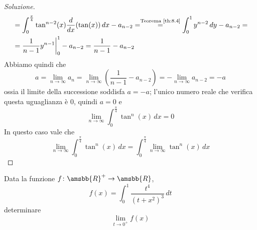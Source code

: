 \begin{proof}[Soluzione]
\[\begin{split}
        & = \int_0^{\frac{\pi}{4}}\tan^{n-2}(x) \frac{d}{dx}(\tan(x))\, dx - a_{n-2} = \overset{\text{Teorema \ref{th:8.4}}}{=} \int_0^1 y^{n-2}\, dy - a_{n-2} = \\
        & = \frac{1}{n-1} y^{n-1}\bigg|_0^1 - a_{n-2} = \frac{1}{n-1}-a_{n-2}
    \end{split}
    \]
    Abbiamo quindi che
    \[
    a = \lim_{n\to \infty} a_n = \lim_{n\to\infty}\left( \frac{1}{n-1} - a_{n-2}\right) = -\lim_{n\to\infty}a_{n-2} = -a
    \]
    ossia il limite della successione soddisfa $a=-a$; l'unico numero reale che verifica questa uguaglianza è $0$, quindi $a=0$ e
    \[
    \lim_{n\to\infty} \int_0^{\frac{\pi}{4}} \tan^n(x)\, dx = 0
    \]
    In questo caso vale che
    \[
    \lim_{n\to\infty} \int_0^{\frac{\pi}{4}} \tan^n(x)\, dx = \int_0^{\frac{\pi}{4}}\lim_{n\to\infty} \tan^n(x)\, dx
    \]
\end{proof}
\begin{exercise}
    \label{ex:9.6}
    Data la funzione $f\colon\amsbb{R}^+\to \amsbb{R}$,
    \[
    f(x) = \int_0^1 \frac{t^4}{(t+x^2)^3}\, dt
    \]
    determinare
    \[
    \lim_{t\to 0^+} f(x)
    \]
\end{exercise}
